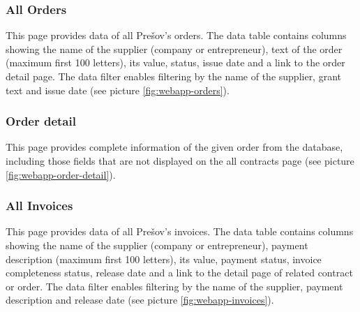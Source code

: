 \documentclass[thesis=B,english]{sprlajur-slovakopendata}[2018/05/12]
\begin{document}
\subsubsection{All Orders}
This page provides data of all Prešov's orders. The data table contains columns showing the name of the  supplier (company or entrepreneur), text of the order (maximum first 100 letters), its value, status, issue date and a link to the order detail page. The data filter enables filtering by the name of the supplier, grant text and issue date (see picture \ref{fig:webapp-orders}).


\subsubsection{Order detail}
This page provides complete information of the given order from the database, including those fields that are not displayed on the all contracts page (see picture \ref{fig:webapp-order-detail}).


\subsubsection{All Invoices}
This page provides data of all Prešov's invoices. The data table contains columns showing the name of the  supplier (company or entrepreneur), payment description (maximum first 100 letters), its value, payment status, invoice completeness status, release date and a link to the detail page of related contract or order. The data filter enables filtering by the name of the supplier, payment description and release date (see picture \ref{fig:webapp-invoices}).
\end{document}
